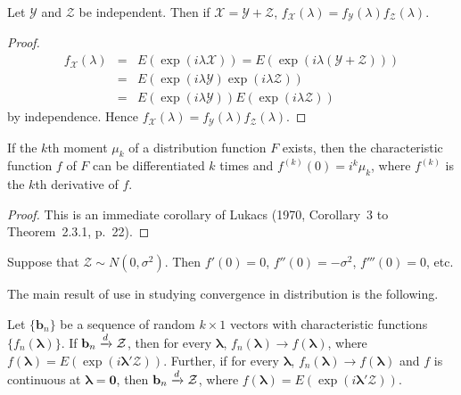 \begin{proposition}\label{prop:4.14}
Let $\mathcal{Y}$ and $\mathcal{Z}$ be independent. Then if $\mathcal{X} = \mathcal{Y} + \mathcal{Z}$, $f_{\mathcal{X}}(\lambda) = f_{\mathcal{Y}}(\lambda)f_{\mathcal{Z}}(\lambda)$.
\end{proposition}

\begin{proof}
\begin{eqnarray*}
f_{\mathcal{X}}(\lambda) &=& E(\exp(i\lambda\mathcal{X})) = E(\exp(i\lambda(\mathcal{Y} + \mathcal{Z})))\\
&=& E(\exp(i\lambda\mathcal{Y})\exp(i\lambda\mathcal{Z}))\\
&=& E(\exp(i\lambda\mathcal{Y}))E(\exp(i\lambda\mathcal{Z}))
\end{eqnarray*}
by independence. Hence $f_{\mathcal{X}}(\lambda) = f_{\mathcal{Y}}(\lambda)f_{\mathcal{Z}}(\lambda)$.
\end{proof}

\begin{proposition}\label{prop:4.15}
If the $k$th moment $\mu_k$ of a distribution function $F$ exists, then the characteristic function $f$ of $F$ can be differentiated $k$ times and $f^{(k)}(0) = i^k\mu_k$, where $f^{(k)}$ is the $k$th derivative of $f$.
\end{proposition}

\begin{proof}
This is an immediate corollary of Lukacs (1970, Corollary~3 to
Theorem~2.3.1, p.~22).
\end{proof}

\begin{example}\label{ex:4.16}
Suppose that $\mathcal{Z} \sim N(0, \sigma^2)$. Then $f'(0) = 0$, $f''(0) = -\sigma^2$, $f'''(0) = 0$, etc.
\end{example}

The main result of use in studying convergence in distribution is the
following.

\begin{theorem}\label{thm:4.17}
Let $\{\mathbf{b}_n\}$ be a sequence of random $k \times 1$ vectors with characteristic functions $\{f_n(\boldsymbol{\lambda})\}$. If $\mathbf{b}_n \xrightarrow{d} \mathcal{Z}$, then for every $\boldsymbol{\lambda}$, $f_n(\boldsymbol{\lambda}) \to f(\boldsymbol{\lambda})$, where $f(\boldsymbol{\lambda}) = E(\exp(i\boldsymbol{\lambda}'\mathcal{Z}))$. Further, if for every $\boldsymbol{\lambda}$, $f_n(\boldsymbol{\lambda}) \to f(\boldsymbol{\lambda})$ and $f$ is continuous at $\boldsymbol{\lambda} = \mathbf{0}$, then $\mathbf{b}_n \xrightarrow{d} \mathcal{Z}$, where $f(\boldsymbol{\lambda}) = E(\exp(i\boldsymbol{\lambda}'\mathcal{Z}))$.
\end{theorem}

